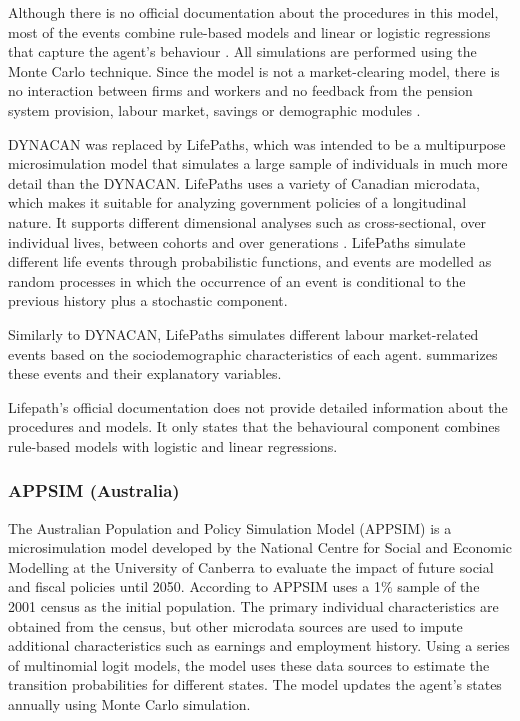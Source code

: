 Although there is no official documentation about the procedures in this model, most of the events combine rule-based models and linear or logistic regressions that capture the agent's behaviour \citep{Joseph1997}​. All simulations are performed using the Monte Carlo technique. Since the model is not a market-clearing model, there is no interaction between firms and workers and no feedback from the pension system provision, labour market, savings or demographic modules \citep{Joseph1997}.

DYNACAN was replaced by LifePaths, which was intended to be a multipurpose microsimulation model that simulates a large sample of individuals in much more detail than the DYNACAN. LifePaths uses a variety of Canadian microdata, which makes it suitable for analyzing government policies of a longitudinal nature. It supports different dimensional analyses such as cross-sectional, over individual lives, between cohorts and over generations \citep{StatsCAN2013}. LifePaths simulate different life events through probabilistic functions, and events are modelled as random processes in which the occurrence of an event is conditional to the previous history plus a stochastic component. 

Similarly to DYNACAN, LifePaths simulates different labour market-related events based on the sociodemographic characteristics of each agent.  summarizes these events and their explanatory variables.



Lifepath's official documentation does not provide detailed information about the procedures and models. It only states that the behavioural component combines rule-based models with logistic and linear regressions. 

\subsubsection{APPSIM (Australia)} 

The Australian Population and Policy Simulation Model (APPSIM) is a microsimulation model developed by the National Centre for Social and Economic Modelling at the University of Canberra to evaluate the impact of future social and fiscal policies until 2050. According to \citet{Keegan2007} APPSIM uses a 1\% sample of the 2001 census as the initial population. The primary individual characteristics are obtained from the census, but other microdata sources are used to impute additional characteristics such as earnings and employment history. Using a series of multinomial logit models, the model uses these data sources to estimate the transition probabilities for different states. The model updates the agent's states annually using Monte Carlo simulation. 

